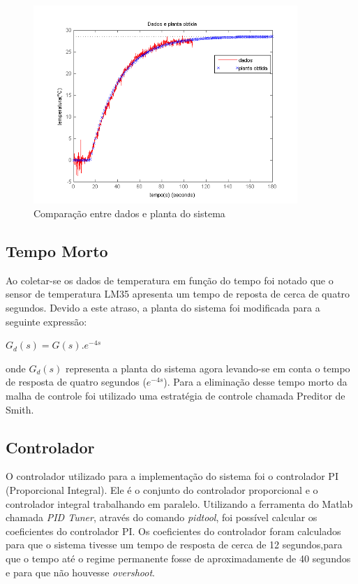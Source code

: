 \begin{figure}[H]

\center

\includegraphics[width=10cm]{imagens/grafico_planta_dados.png}

\label{Comparação entre dados e planta do sistema}

\caption{Comparação entre dados e planta do sistema}


\end{figure}

\subsection{Tempo Morto}

Ao coletar-se os dados de temperatura em função do tempo foi notado que o sensor de temperatura LM35 apresenta um tempo de reposta de cerca de quatro segundos. Devido a este atraso, a planta do sistema foi modificada para a seguinte expressão:

\begin{center}

$G_d(s) = G(s).e^ {-4s}$

\end{center}

\noindent onde $G_d(s)$ representa a planta do sistema agora levando-se em conta o tempo de resposta de quatro segundos ($e^{-4s}$).
Para a eliminação desse tempo morto da malha de controle foi utilizado uma estratégia de controle chamada Preditor de Smith.

\subsection{Controlador}

O controlador utilizado para a implementação do sistema foi o controlador PI (Proporcional Integral). Ele é o conjunto do controlador proporcional e o controlador integral trabalhando em paralelo. Utilizando a ferramenta do Matlab chamada \textit{PID Tuner}, através do comando \textit{pidtool}, foi possível calcular os coeficientes do controlador PI. Os coeficientes do controlador foram calculados para que o sistema tivesse um tempo de resposta de cerca de 12 segundos,para que o tempo até o regime permanente fosse de aproximadamente de 40 segundos e para que não houvesse \textit{overshoot}.

